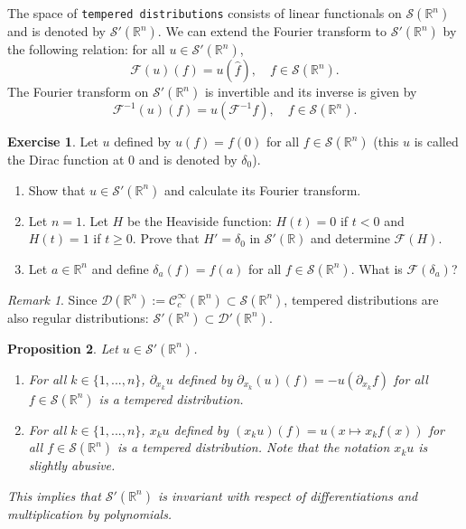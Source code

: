 \documentclass[a4paper, 12pt]{article}
\theoremstyle{plain}
\newtheorem{proposition}{Proposition}[section]
\theoremstyle{definition}
\newtheorem{exercise}{Exercise}
\theoremstyle{remark}
\newtheorem{remark}[proposition]{Remark}
\numberwithin{equation}{section}
\begin{document}
The space of {\tt tempered distributions} consists of linear functionals on ${\mathscr{S}}({\mathds{R}}^n)$ and is denoted by
${\mathscr{S}}'({\mathds{R}}^n)$. We can extend the Fourier transform to ${\mathscr{S}}'({\mathds{R}}^n)$ by the following relation:
for all $u\in {\mathscr{S}}'({\mathds{R}}^n)$,
\[
{\mathscr{F}}(u)(f)=u(\hat{f}), \quad f\in {\mathscr{S}}({\mathds{R}}^n). 
\]
The Fourier transform on ${\mathscr{S}}'({\mathds{R}}^n)$ is invertible and its inverse is given by 
\[
{\mathscr{F}}^{-1}(u)(f)=u({\mathscr{F}}^{-1}{f}), \quad f\in {\mathscr{S}}({\mathds{R}}^n). 
\]

\begin{exercise}
Let $u$ defined by $u(f)=f(0)$ for all $f\in{\mathscr{S}}({\mathds{R}}^n)$ (this $u$ is called the Dirac function at 0 and is denoted by $\delta_0$). 
%
\begin{enumerate}
\item
Show that $u\in {\mathscr{S}}'({\mathds{R}}^n)$ and calculate its Fourier transform.
\item
Let $n=1$.
Let $H$ be the Heaviside function: $H(t)=0$ if $t< 0$ and $H(t)=1$ if $t\ge 0$. Prove that $H'=\delta_0$ in ${\mathscr{S}}'({\mathds{R}})$ 
and determine ${\mathscr{F}}(H)$. 
\item
Let $a\in{\mathds{R}}^n$ and define $\delta_a(f)=f(a)$ for all $f\in{\mathscr{S}}({\mathds{R}}^n)$. What is ${\mathscr{F}}(\delta_a)$?
\end{enumerate}
\end{exercise}

\begin{remark}
Since ${\mathscr{D}}({\mathds{R}}^n):={\mathscr{C}}_c^\infty({\mathds{R}}^n)\subset {\mathscr{S}}({\mathds{R}}^n)$, tempered distributions
are also regular distributions: ${\mathscr{S}}'({\mathds{R}}^n) \subset {\mathscr{D}}'({\mathds{R}}^n)$. 
\end{remark}

\begin{proposition}
Let $u\in {\mathscr{S}}'({\mathds{R}}^n)$. 
%
\begin{enumerate}
\item
For all $k\in \{1,...,n\}$, $\partial_{x_k}u$ defined by $\partial_{x_k}(u)(f)=-u(\partial_{x_k}f)$ for all $f\in{\mathscr{S}}({\mathds{R}}^n)$
is a tempered distribution.
\item
For all $k\in \{1,...,n\}$, $x_k u$ defined by $(x_k u)(f)=u(x\mapsto x_kf(x))$ for all $f\in{\mathscr{S}}({\mathds{R}}^n)$
is a tempered distribution. Note that the notation $x_k u$ is slightly abusive.
\end{enumerate}
%
This implies that ${\mathscr{S}}'({\mathds{R}}^n)$ is invariant with respect of differentiations and multiplication by polynomials.
\end{proposition}
\end{document}
